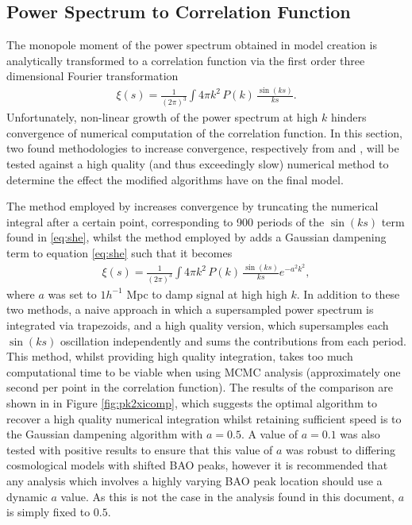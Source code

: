 \documentclass[titlesmallcaps, examinerscopy, copyrightpage]{uqthesis}
\begin{document}
\begin{appendices}
\chapter{Power Spectrum to Correlation Function} \label{app:pk2xi}

The monopole moment of the power spectrum obtained in model creation is analytically transformed to a correlation function via the first order three dimensional Fourier transformation 
\begin{align} \label{eq:she}
\xi(s) = \frac{1}{(2 \pi)^3} \int 4 \pi k^2 \, P(k)\,  \frac{\sin(ks)}{ks}.
\end{align}
Unfortunately, non-linear growth of the power spectrum at high $k$ hinders convergence of numerical computation of the correlation function. In this section, two found methodologies to increase convergence, respectively from \citet{BlakeDavis2011} and \citet{AndersonAubourg2012}, will be tested against a high quality (and thus exceedingly slow) numerical method to determine the effect the modified algorithms have on the final model.

The method employed by \citet{BlakeDavis2011} increases convergence by truncating the numerical integral after a certain point, corresponding to 900 periods of the $\sin(ks)$ term found in \eqref{eq:she}, whilst the method employed by \citet{AndersonAubourg2012} adds a Gaussian dampening term to equation \eqref{eq:she} such that it becomes
\begin{align}
\xi(s) = \frac{1}{(2 \pi)^3} \int 4 \pi k^2 \, P(k)\,  \frac{\sin(ks)}{ks} e^{-a^2 k^2},
\end{align}
where $a$ was set to $1 h^{-1}$ Mpc to damp signal at high high $k$. In addition to these two methods, a naive approach in which a supersampled power spectrum is integrated via trapezoids, and a high quality version, which supersamples each $\sin(ks)$ oscillation independently and sums the contributions from each period. This method, whilst providing high quality integration, takes too much computational time to be viable when using MCMC analysis (approximately one second per point in the correlation function). The results of the comparison are shown in in Figure \ref{fig:pk2xicomp}, which suggests the optimal algorithm to recover a high quality numerical integration whilst retaining sufficient speed is to the Gaussian dampening algorithm with $a=0.5$. A value of $a=0.1$ was also tested with positive results to ensure that this value of $a$ was robust to differing cosmological models with shifted BAO peaks, however it is recommended that any analysis which involves a highly varying BAO peak location should use a dynamic $a$ value. As this is not the case in the analysis found in this document, $a$ is simply fixed to $0.5$.


\end{appendices}
\end{document}
